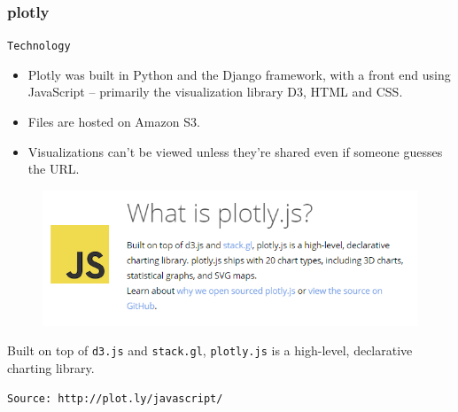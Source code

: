 \documentclass{beamer}
\begin{document}
\begin{frame}
\frametitle{plotly}
\Large	
	\texttt{Technology}
\begin{itemize}
	\item Plotly was built in Python and the Django framework, with a front end using JavaScript -- primarily the visualization library D3, HTML and CSS. 
	\item Files are hosted on Amazon S3. 
	\item Visualizations can't be viewed unless they're shared even if someone guesses the URL.
\end{itemize}
\end{frame}

\begin{frame}[fragile]
	\Large
\vspace{-1cm}

	\begin{figure}
\centering
\includegraphics[width=1.10\linewidth]{plotlyjs}

\end{figure}
Built on top of \texttt{d3.js} and \texttt{stack.gl}, \texttt{plotly.js} is a high-level, declarative charting library.
{
\large
\begin{verbatim}
Source: http://plot.ly/javascript/
\end{verbatim}
}
\end{frame}
\end{document}
